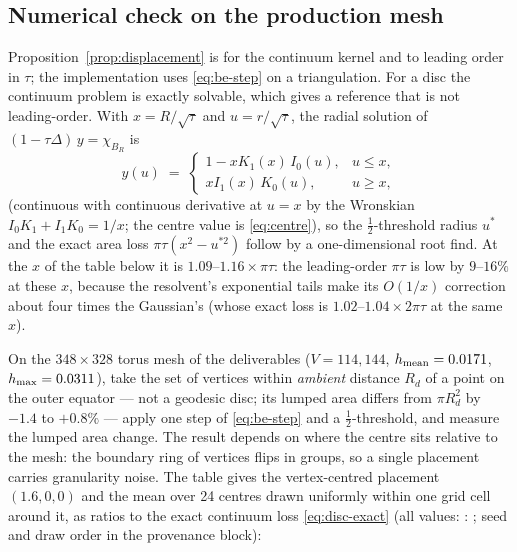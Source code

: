 \documentclass[11pt,a4paper]{article}
\begin{document}
\subsection{Numerical check on the production mesh}
\label{sec:check}

Proposition~\ref{prop:displacement} is for the continuum kernel and to leading
order in $\tau$; the implementation uses \eqref{eq:be-step} on a triangulation.
For a disc the continuum problem is exactly solvable, which gives a reference
that is not leading-order. With $x = R/\sqrt\tau$ and $u = r/\sqrt\tau$, the
radial solution of $(1 - \tau\Delta)\, y = \chi_{B_R}$ is
\begin{equation}
  y(u) \;=\;
  \begin{cases}
    1 - x K_1(x)\, I_0(u), & u \le x,\\
    x I_1(x)\, K_0(u), & u \ge x,
  \end{cases}
  \label{eq:disc-exact}
\end{equation}
(continuous with continuous derivative at $u = x$ by the Wronskian
$I_0 K_1 + I_1 K_0 = 1/x$; the centre value is \eqref{eq:centre}), so the
$\tfrac12$-threshold radius $u^\ast$ and the exact area loss
$\pi\tau (x^2 - u^{\ast 2})$ follow by a one-dimensional root find. At the $x$ of
the table below it is $1.09$--$1.16 \times \pi\tau$: the leading-order $\pi\tau$
is low by $9$--$16\%$ at these $x$, because the resolvent's exponential tails
make its $O(1/x)$ correction about four times the Gaussian's (whose exact loss
is $1.02$--$1.04 \times 2\pi\tau$ at the same $x$).

On the $348 \times 328$ torus mesh of the deliverables ($V = 114{,}144$,
$h_{\mathrm{mean}} = 0.0171$, $h_{\mathrm{max}} = 0.0311$), take the set of vertices within
\emph{ambient} distance $R_d$ of a point on the outer equator --- not a geodesic
disc; its lumped area differs from $\pi R_d^2$ by $-1.4$ to $+0.8\%$ --- apply one
step of \eqref{eq:be-step} and a $\tfrac12$-threshold, and measure the lumped
area change. The result depends on where the centre sits relative to the mesh:
the boundary ring of vertices flips in groups, so a single placement carries
granularity noise. The table gives the vertex-centred placement $(1.6, 0, 0)$
and the mean over 24 centres drawn uniformly within one grid cell around it, as
ratios to the exact continuum loss \eqref{eq:disc-exact} (all values:
: ; seed and draw order in the provenance
block):
\end{document}
